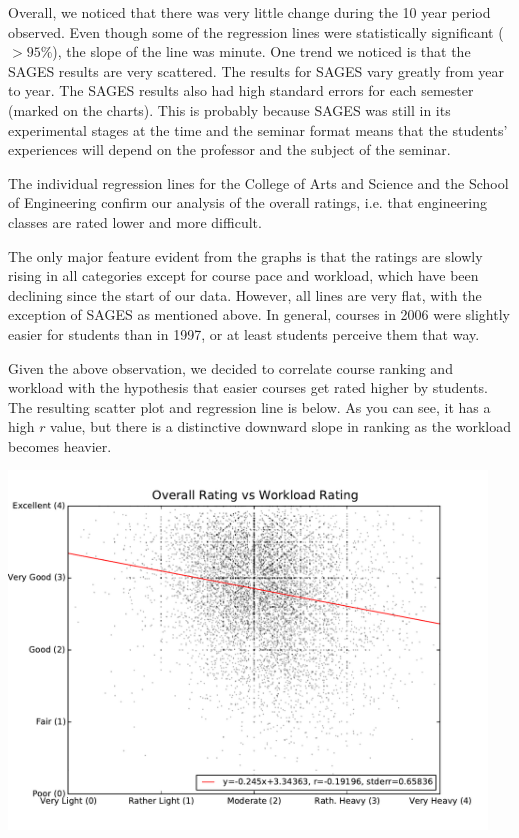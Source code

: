 \documentclass[12pt]{article}
\begin{document}
Overall, we noticed that there was very little change during the 10 year period observed. Even though some of the regression lines were statistically significant ($> 95\%$), the slope of the line was minute. One trend we noticed is that the SAGES results are very scattered. The results for SAGES vary greatly from year to year. The SAGES results also had high standard errors for each semester (marked on the charts). This is probably because SAGES was still in its experimental stages at the time and the seminar format means that the students' experiences will depend on the professor and the subject of the seminar.

The individual regression lines for the College of Arts and Science and the School of Engineering confirm our analysis of the overall ratings, i.e. that engineering classes are rated lower and more difficult.

The only major feature evident from the graphs is that the ratings are slowly rising in all categories except for course pace and workload, which have been declining since the start of our data. However, all lines are very flat, with the exception of SAGES as mentioned above. In general, courses in 2006 were slightly easier for students than in 1997, or at least students perceive them that way.

Given the above observation, we decided to correlate course ranking and workload with the hypothesis that easier courses get rated higher by students. The resulting scatter plot and regression line is below. As you can see, it has a high $r$ value, but there is a distinctive downward slope in ranking as the workload becomes heavier.

\begin{center}
    \includegraphics[width=5in]{figures/rating_vs_workload.pdf}
\end{center}
\end{document}
